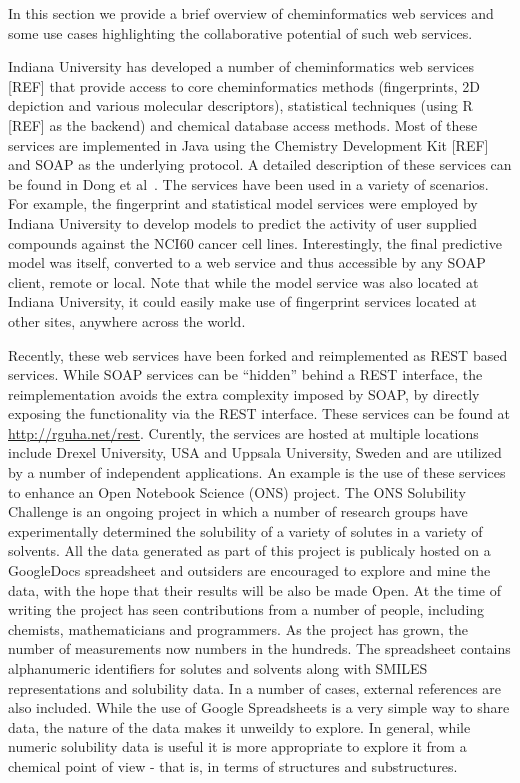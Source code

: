 \documentclass[12pt]{book}
\begin{document}
In this section we provide a brief overview of cheminformatics web
services and some use cases highlighting the collaborative potential
of such web services.

Indiana University has developed a number of cheminformatics web
services [REF] that provide access to core cheminformatics methods
(fingerprints, 2D depiction and various molecular descriptors),
statistical techniques (using R [REF] as the backend) and chemical
database access methods. Most of these services are implemented in
Java using the Chemistry Development Kit [REF] and SOAP as the
underlying protocol. A detailed description of these services can be
found in Dong et al~\cite{Dong2007Web}. The services have been used in
a variety of scenarios. For example, the fingerprint and statistical
model services were employed by Indiana University to develop
models to predict the activity of user supplied compounds against the
NCI60 cancer cell lines. Interestingly, the final predictive model was
itself, converted to a web service and thus accessible by any SOAP client,
remote or local. Note that while the model service was also located at
Indiana University, it could easily make use of fingerprint services
located at other sites, anywhere across the world.

Recently, these web services have been forked and reimplemented as
REST based services. While SOAP services can be ``hidden'' behind a
REST interface, the reimplementation avoids the extra complexity
imposed by SOAP, by directly exposing the functionality via the REST
interface. These services can be found at
\href{http://rguha.net/rest}{http://rguha.net/rest}. Curently, the
services are hosted at multiple locations include Drexel University,
USA and Uppsala University, Sweden and are utilized by a number of
independent applications. An example is the use of these services to
enhance an Open Notebook Science (ONS) project. The ONS Solubility
Challenge is an ongoing project in which a number of research groups
have experimentally determined the solubility of a variety of solutes
in a variety of solvents. All the data generated as part of this
project is publicaly hosted on a GoogleDocs spreadsheet and outsiders
are encouraged to explore and mine the data, with the hope that their
results will be also be made Open. At the time of writing the project
has seen contributions from a number of people, including chemists,
mathematicians and programmers. As the project has grown, the number
of measurements now numbers in the hundreds. The spreadsheet contains
alphanumeric identifiers for solutes and solvents along with SMILES
representations and solubility data. In a number of cases, external
references are also included. While the use of Google Spreadsheets is
a very simple way to share data, the nature of the data makes it
unweildy to explore. In general, while numeric solubility data is
useful it is more appropriate to explore it from a chemical point of
view - that is, in terms of structures and substructures.
\end{document}
